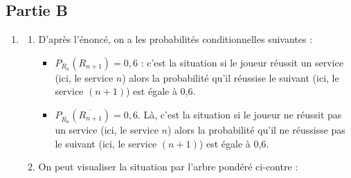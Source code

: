 \documentclass[10pt]{article}
\begin{document}
\subsection*{Partie B}

\begin{enumerate}
	\item \begin{enumerate}
		\item D'après l'énoncé, on a les probabilités conditionnelles suivantes :

		\begin{itemize}[label=$\bullet$]
			\item $P_{R_{n}}\left(R_{n + 1}\right) = 0,6$ : c'est la situation \og si le joueur réussit un service (ici, le service $n$) alors la probabilité qu'il réussise le suivant (ici, le service $(n+1)$) est égale à 0,6\fg{}.
			\item  $P_{\overline{R_{n}}}\left(\overline{R_{n + 1}}\right) = 0,6$. Là, c'est la situation \og si le joueur ne réussit pas un service (ici, le service $n$) alors la probabilité qu'il ne réussisse pas le suivant (ici, le service $(n+1)$) est égale à 0,6\fg{}.
		\end{itemize}

		\item \begin{minipage}[t]{0.4\linewidth}
		On peut visualiser la situation par l'arbre pondéré ci-contre : \end{minipage}
	\hfill
{}
\end{enumerate}
\end{enumerate}
\end{document}
